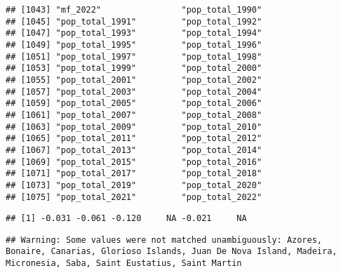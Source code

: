 \documentclass[
]{article}
\newenvironment{Shaded}{\begin{snugshade}}{\end{snugshade}}
\newcommand{\AttributeTok}[1]{\textcolor[rgb]{0.13,0.29,0.53}{#1}}
\newcommand{\DocumentationTok}[1]{\textcolor[rgb]{0.56,0.35,0.01}{\textbf{\textit{#1}}}}
\newcommand{\FunctionTok}[1]{\textcolor[rgb]{0.13,0.29,0.53}{\textbf{#1}}}
\newcommand{\NormalTok}[1]{#1}
\newcommand{\OtherTok}[1]{\textcolor[rgb]{0.56,0.35,0.01}{#1}}
\newcommand{\SpecialCharTok}[1]{\textcolor[rgb]{0.81,0.36,0.00}{\textbf{#1}}}
\newcommand{\StringTok}[1]{\textcolor[rgb]{0.31,0.60,0.02}{#1}}
\begin{document}
\begin{verbatim}
## [1043] "mf_2022"                "pop_total_1990"        
## [1045] "pop_total_1991"         "pop_total_1992"        
## [1047] "pop_total_1993"         "pop_total_1994"        
## [1049] "pop_total_1995"         "pop_total_1996"        
## [1051] "pop_total_1997"         "pop_total_1998"        
## [1053] "pop_total_1999"         "pop_total_2000"        
## [1055] "pop_total_2001"         "pop_total_2002"        
## [1057] "pop_total_2003"         "pop_total_2004"        
## [1059] "pop_total_2005"         "pop_total_2006"        
## [1061] "pop_total_2007"         "pop_total_2008"        
## [1063] "pop_total_2009"         "pop_total_2010"        
## [1065] "pop_total_2011"         "pop_total_2012"        
## [1067] "pop_total_2013"         "pop_total_2014"        
## [1069] "pop_total_2015"         "pop_total_2016"        
## [1071] "pop_total_2017"         "pop_total_2018"        
## [1073] "pop_total_2019"         "pop_total_2020"        
## [1075] "pop_total_2021"         "pop_total_2022"
\end{verbatim}

\begin{Shaded}
\end{Shaded}

\begin{verbatim}
## [1] -0.031 -0.061 -0.120     NA -0.021     NA
\end{verbatim}

\begin{Shaded}
\end{Shaded}

\begin{verbatim}
## Warning: Some values were not matched unambiguously: Azores, Bonaire, Canarias, Glorioso Islands, Juan De Nova Island, Madeira, Micronesia, Saba, Saint Eustatius, Saint Martin
\end{verbatim}
\end{document}
